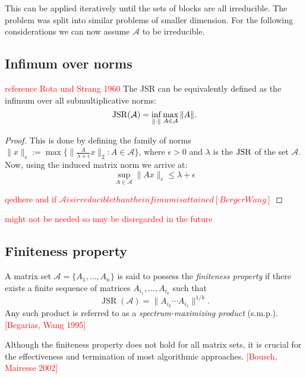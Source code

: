 This can be applied iteratively until the sets of blocks are all irreducible.
The problem was split into similar problems of smaller dimension.
For the following considerations we can now assume $\mathcal{A}$ to be irreducible.

\subsection*{Infimum over norms}
\begin{proposition}
    \textcolor{red}{reference Rota und Strang 1960}
    The JSR can be equivalently defined as the infimum over all submultiplicative norms:
    \begin{equation}
        \operatorname{JSR}(\mathcal{A}) = \inf_{\|\cdot\|} \max_{A \in \mathcal{A}} \|A\|.
    \end{equation}
\end{proposition}

\begin{proof}
    This is done by defining the family of norms $\|x\|_{\epsilon} := \max \{ \| \frac{A}{\lambda + \epsilon}x\|_2 : A \in \mathcal{A}\}$,
    where $\epsilon > 0$ and $\lambda$ is the $\operatorname{JSR}$ of the set $\mathcal{A}$.
    Now, using the induced matrix norm we arrive at: 
    $$ \sup _{A \in \mathcal{A}} \|Ax\|_{\epsilon} \leq \lambda + \epsilon$$

\textcolor{red}{qedhere and if $\mathcal{A} is irreducible than the infimum is attained [BergerWang]$}

\end{proof}

\textcolor{red}{might not be needed so may be disregarded in the future}

\subsection*{Finiteness property}
\begin{definition}
    A matrix set $\mathcal{A} = \{ A_1, \dots, A_n \}$ is said to possess the \emph{finiteness property} if there exists a finite sequence of matrices $A_{i_1}, \dots, A_{i_k}$ such that
    \begin{equation}
        \operatorname{JSR}(\mathcal{A}) = \|A_{i_k} \cdots A_{i_1}\|^{1/k}.
    \end{equation}
    Any such product is referred to as a \emph{spectrum-maximizing product} (s.m.p.).
    \textcolor{red}{[Begarias, Wang 1995]}
\end{definition}
Although the finiteness property does not hold for all matrix sets, it is crucial for the effectiveness and termination of most algorithmic approaches.
\textcolor{red}{[Bousch, Mairesse 2002]}

